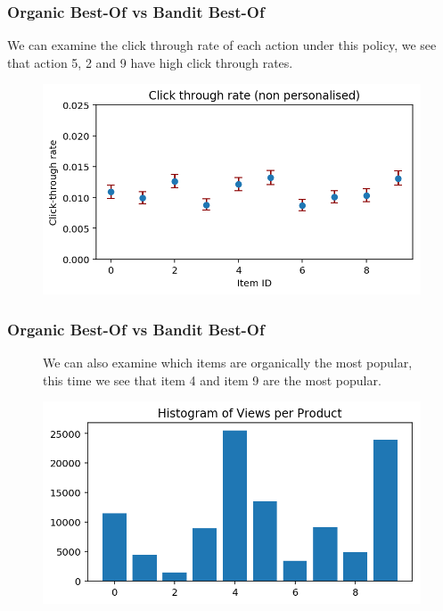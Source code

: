 \begin{frame}
\frametitle{Organic Best-Of vs Bandit Best-Of}

We can examine the click through rate of each action under this policy, we see that action 5, 2 and 9 have high click through rates.

\begin{figure}[h!]
\includegraphics[scale=0.4]{images/organic_bestof1.png}
\centering
\label{motex1}
\end{figure}
\end{frame}

\begin{frame}
\frametitle{Organic Best-Of vs Bandit Best-Of}


\begin{figure}[h!]

  We can also examine which items are organically the most popular, this time we see that item 4 and item 9 are the most popular.

  \includegraphics[scale=0.4]{images/organic_bestof2.png}
\centering
\label{motex1}
\end{figure}
\end{frame}

